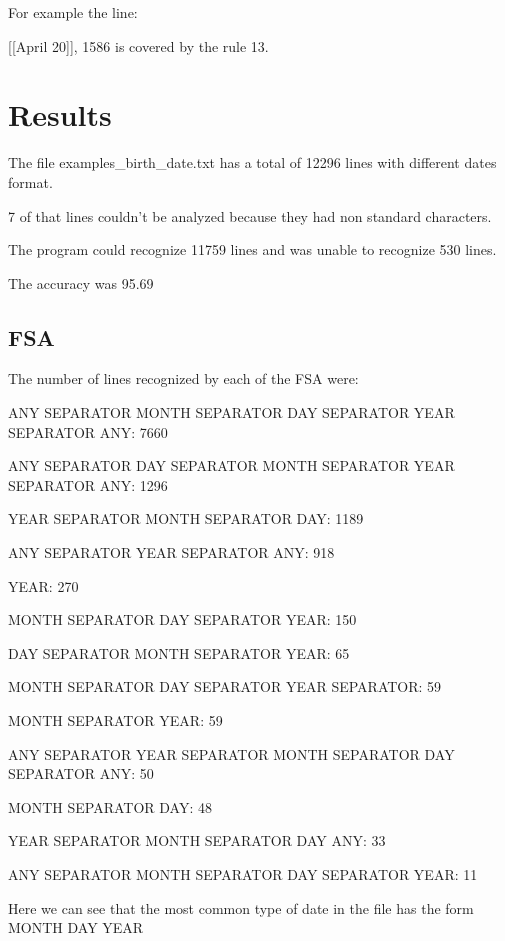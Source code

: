 \documentclass[letterpaper]{article}
\begin{document}
For example the line:

[[April 20]], 1586 is covered by the rule 13.

\section{Results}
The file examples\_birth\_date.txt has a total of 12296 lines with different dates format.

7 of that lines couldn't be analyzed because they had non standard characters.

The program could recognize 11759 lines and was unable to recognize 530 lines.

The accuracy was 95.69

\subsection{FSA}
The number of lines recognized by each of the FSA were:

ANY SEPARATOR MONTH SEPARATOR DAY SEPARATOR YEAR SEPARATOR ANY: 7660

ANY SEPARATOR DAY SEPARATOR MONTH SEPARATOR YEAR SEPARATOR ANY: 1296

YEAR SEPARATOR MONTH SEPARATOR DAY: 1189

ANY SEPARATOR YEAR SEPARATOR ANY: 918

YEAR: 270

MONTH SEPARATOR DAY SEPARATOR YEAR: 150

DAY SEPARATOR MONTH SEPARATOR YEAR: 65

MONTH SEPARATOR DAY SEPARATOR YEAR SEPARATOR: 59

MONTH SEPARATOR YEAR: 59

ANY SEPARATOR YEAR SEPARATOR MONTH SEPARATOR DAY SEPARATOR ANY: 50

MONTH SEPARATOR DAY: 48

YEAR SEPARATOR MONTH SEPARATOR DAY ANY: 33

ANY SEPARATOR MONTH SEPARATOR DAY SEPARATOR YEAR: 11

Here we can see that the most common type of date in the file has the form MONTH DAY YEAR
\end{document}
